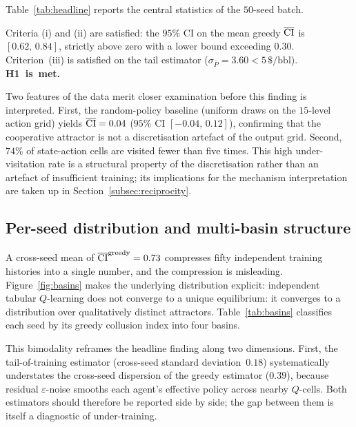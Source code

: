 Table~\ref{tab:headline} reports the central statistics of the
$50$-seed batch.

\begin{verdict*}
Criteria \textup{(i)} and \textup{(ii)} are satisfied: the $95\%$
CI on the mean greedy $\overline{\mathrm{CI}}$ is $[0.62,\,0.84]$, strictly above
zero with a lower bound exceeding $0.30$. Criterion~\textup{(iii)}
is satisfied on the tail estimator
($\sigma_{\bar{P}} = 3.60 < 5\,\$\text{/bbl}$).
\textbf{H1~is~met.}
\end{verdict*}

Two features of the data merit closer examination before this
finding is interpreted. First, the random-policy
baseline (uniform draws on the $15$-level action grid) yields
$\overline{\mathrm{CI}} = 0.04$ ($95\%$ CI $[-0.04,\,0.12]$), confirming
that the cooperative attractor is not a discretisation artefact of
the output grid. Second, $74\%$ of state-action cells are visited
fewer than five times. This high under-visitation rate is a
structural property of the discretisation rather than an artefact
of insufficient training; its implications for the mechanism
interpretation are taken up in
Section~\ref{subsec:reciprocity}.


\subsection{Per-seed distribution and multi-basin structure}
\label{subsec:basins}

A cross-seed mean of $\overline{\mathrm{CI}}^{\text{greedy}} = 0.73$
compresses fifty independent training histories into a single
number, and the compression is misleading. Figure~\ref{fig:basins}
makes the underlying distribution explicit: independent tabular
$Q$-learning does not converge to a unique equilibrium: it
converges to a distribution over qualitatively distinct
attractors. Table~\ref{tab:basins} classifies each seed by its
greedy collusion index into four basins.

This bimodality reframes the headline finding along two
dimensions. First, the tail-of-training estimator (cross-seed
standard deviation~$0.18$) systematically understates the
cross-seed dispersion of the greedy estimator ($0.39$), because
residual $\varepsilon$-noise smooths each agent's effective policy
across nearby $Q$-cells. Both estimators should therefore be
reported side by side; the gap between them is itself a diagnostic
of under-training.

